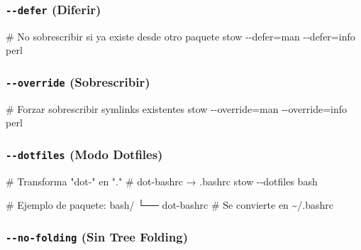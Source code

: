 \documentclass[
  doc,
  floatsintext,
  longtable,
  a4paper,
  nolmodern,
  notxfonts,
  notimes,
  12pt,
  colorlinks=true,linkcolor=blue,citecolor=blue,urlcolor=blue]{apa7}
\newenvironment{Shaded}{\begin{snugshade}}{\end{snugshade}}
\newcommand{\AttributeTok}[1]{\textcolor[rgb]{0.40,0.45,0.13}{#1}}
\newcommand{\CommentTok}[1]{\textcolor[rgb]{0.37,0.37,0.37}{#1}}
\newcommand{\ExtensionTok}[1]{\textcolor[rgb]{0.00,0.23,0.31}{#1}}
\newcommand{\NormalTok}[1]{\textcolor[rgb]{0.00,0.23,0.31}{#1}}
\newcommand{\OperatorTok}[1]{\textcolor[rgb]{0.37,0.37,0.37}{#1}}
\begin{document}
\subsubsection{\texorpdfstring{\texttt{-\/-defer}
(Diferir)}{-\/-defer (Diferir)}}\label{defer-diferir}

\begin{Shaded}
\begin{Highlighting}[]
\CommentTok{\# No sobrescribir si ya existe desde otro paquete}
\ExtensionTok{stow} \AttributeTok{{-}{-}defer}\OperatorTok{=}\NormalTok{man }\AttributeTok{{-}{-}defer}\OperatorTok{=}\NormalTok{info perl}
\end{Highlighting}
\end{Shaded}

\subsubsection{\texorpdfstring{\texttt{-\/-override}
(Sobrescribir)}{-\/-override (Sobrescribir)}}\label{override-sobrescribir}

\begin{Shaded}
\begin{Highlighting}[]
\CommentTok{\# Forzar sobrescribir symlinks existentes}
\ExtensionTok{stow} \AttributeTok{{-}{-}override}\OperatorTok{=}\NormalTok{man }\AttributeTok{{-}{-}override}\OperatorTok{=}\NormalTok{info perl}
\end{Highlighting}
\end{Shaded}

\subsubsection{\texorpdfstring{\texttt{-\/-dotfiles} (Modo
Dotfiles)}{-\/-dotfiles (Modo Dotfiles)}}\label{dotfiles-modo-dotfiles}

\begin{Shaded}
\begin{Highlighting}[]
\CommentTok{\# Transforma "dot{-}" en "."}
\CommentTok{\# dot{-}bashrc → .bashrc}
\ExtensionTok{stow} \AttributeTok{{-}{-}dotfiles}\NormalTok{ bash}

\CommentTok{\# Ejemplo de paquete:}
\ExtensionTok{bash/}
  \ExtensionTok{└──}\NormalTok{ dot{-}bashrc    }\CommentTok{\# Se convierte en \textasciitilde{}/.bashrc}
\end{Highlighting}
\end{Shaded}

\subsubsection{\texorpdfstring{\texttt{-\/-no-folding} (Sin Tree
Folding)}{-\/-no-folding (Sin Tree Folding)}}\label{no-folding-sin-tree-folding}
\end{document}
